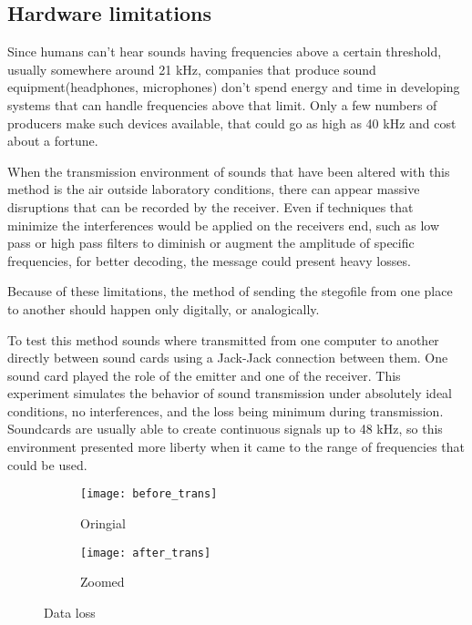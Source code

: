 \documentclass[12pt]{report}
\begin{document}
\subsection{Hardware limitations}
Since humans can't hear sounds having frequencies above a certain threshold,  usually somewhere around 21 kHz, companies that produce sound equipment(headphones, microphones) don't spend energy and time in developing systems that can handle frequencies above that limit. Only a few numbers of producers make such devices available, that could go as high as 40 kHz and cost about a fortune.

When the transmission environment of sounds that have been altered with this method is the air outside laboratory conditions, there can appear massive disruptions that can be recorded by the receiver. Even if techniques that minimize the interferences would be applied on the receivers end, such as low pass or high pass filters to diminish or augment the amplitude of specific frequencies, for better decoding, the message could present heavy losses.

Because of these limitations, the method of sending the stegofile from one place to another should happen only digitally, or analogically.

To test this method sounds where transmitted from one computer to another directly between sound cards using a Jack-Jack connection between them. One sound card played the role of the emitter and one of the receiver. This experiment simulates the behavior of sound transmission under absolutely ideal conditions, no interferences, and the loss being minimum during transmission. Soundcards are usually able to create continuous signals up to 48 kHz, so this environment presented more liberty when it came to the range of frequencies that could be used.




\begin{figure}[h!]
  \centering
  \begin{subfigure}[b]{0.4\linewidth}
    \texttt{[image: before\_trans]}
    \caption{Oringial}
    \label{fig:before_trans}
  \end{subfigure}
  \begin{subfigure}[b]{0.4\linewidth}
    \texttt{[image: after\_trans]}
    \caption{Zoomed}
    \label{fig:after_trans}
  \end{subfigure}
  \caption{Data loss}
  \label{fig:data_loss}
\end{figure}
\end{document}
